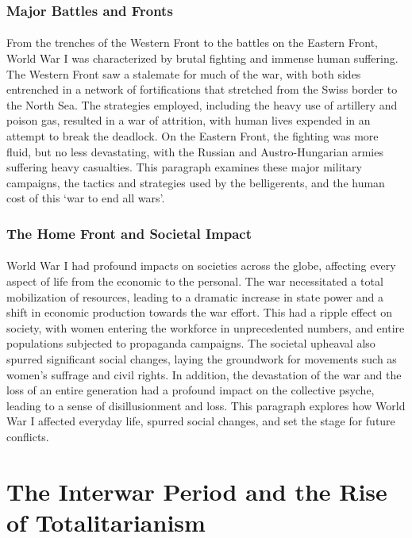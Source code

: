 \documentclass[a4paper,12pt]{book}
\begin{document}
\subsubsection*{Major Battles and Fronts}
\paragraph{}
From the trenches of the Western Front to the battles on the Eastern Front, World War I was characterized by brutal fighting and immense human suffering. The Western Front saw a stalemate for much of the war, with both sides entrenched in a network of fortifications that stretched from the Swiss border to the North Sea. The strategies employed, including the heavy use of artillery and poison gas, resulted in a war of attrition, with human lives expended in an attempt to break the deadlock. On the Eastern Front, the fighting was more fluid, but no less devastating, with the Russian and Austro-Hungarian armies suffering heavy casualties. This paragraph examines these major military campaigns, the tactics and strategies used by the belligerents, and the human cost of this ‘war to end all wars’.

\subsubsection*{The Home Front and Societal Impact}
\paragraph{}
World War I had profound impacts on societies across the globe, affecting every aspect of life from the economic to the personal. The war necessitated a total mobilization of resources, leading to a dramatic increase in state power and a shift in economic production towards the war effort. This had a ripple effect on society, with women entering the workforce in unprecedented numbers, and entire populations subjected to propaganda campaigns. The societal upheaval also spurred significant social changes, laying the groundwork for movements such as women’s suffrage and civil rights. In addition, the devastation of the war and the loss of an entire generation had a profound impact on the collective psyche, leading to a sense of disillusionment and loss. This paragraph explores how World War I affected everyday life, spurred social changes, and set the stage for future conflicts.

\section*{The Interwar Period and the Rise of Totalitarianism}
\end{document}
